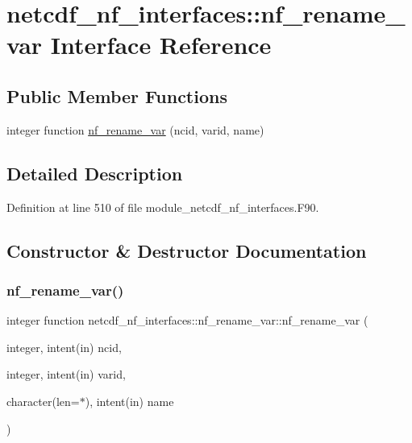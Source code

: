 \hypertarget{interfacenetcdf__nf__interfaces_1_1nf__rename__var}{}\section{netcdf\+\_\+nf\+\_\+interfaces\+:\+:nf\+\_\+rename\+\_\+var Interface Reference}
\label{interfacenetcdf__nf__interfaces_1_1nf__rename__var}
\subsection*{Public Member Functions}
\begin{DoxyCompactItemize}
\item 
integer function \hyperlink{interfacenetcdf__nf__interfaces_1_1nf__rename__var_a1c37ce241cd795eea1b76b190901b7e8}{nf\+\_\+rename\+\_\+var} (ncid, varid, name)
\end{DoxyCompactItemize}


\subsection{Detailed Description}


Definition at line 510 of file module\+\_\+netcdf\+\_\+nf\+\_\+interfaces.\+F90.



\subsection{Constructor \& Destructor Documentation}
\mbox{\label{interfacenetcdf__nf__interfaces_1_1nf__rename__var_a1c37ce241cd795eea1b76b190901b7e8}} 
\subsubsection{\texorpdfstring{nf\+\_\+rename\+\_\+var()}{nf\_rename\_var()}}
{\footnotesize\ttfamily integer function netcdf\+\_\+nf\+\_\+interfaces\+::nf\+\_\+rename\+\_\+var\+::nf\+\_\+rename\+\_\+var (\begin{DoxyParamCaption}\item[{integer, intent(in)}]{ncid,  }\item[{integer, intent(in)}]{varid,  }\item[{character(len=$\ast$), intent(in)}]{name }\end{DoxyParamCaption})}



